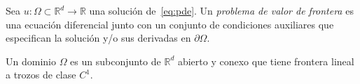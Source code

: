 \begin{definition}
    Sea
    \begin{math}
        u\colon
        \Omega\subset
        \mathbb{R}^{d}\to
        \mathbb{R}
    \end{math}
    una solución de~\eqref{eq:pde}.
    Un \emph{problema de valor de frontera} es una ecuación
    diferencial junto con un conjunto de condiciones auxiliares que
    especifican la solución y/o sus derivadas en $\partial\Omega$.
\end{definition}

\begin{definition}[Dominio]
    Un dominio $\Omega$ es un subconjunto de $\mathbb{R}^{d}$ abierto
    y conexo que tiene frontera lineal a trozos de clase $C^{1}$.
\end{definition}

